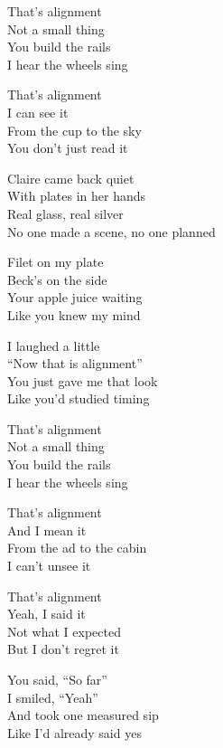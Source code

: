 \begin{lyrics}
That’s alignment\\
Not a small thing\\
You build the rails\\
I hear the wheels sing

That’s alignment\\
I can see it\\
From the cup to the sky\\
You don’t just read it

Claire came back quiet\\
With plates in her hands\\
Real glass, real silver\\
No one made a scene, no one planned

Filet on my plate\\
Beck’s on the side\\
Your apple juice waiting\\
Like you knew my mind

I laughed a little\\
“Now that is alignment”\\
You just gave me that look\\
Like you’d studied timing

That’s alignment\\
Not a small thing\\
You build the rails\\
I hear the wheels sing

That’s alignment\\
And I mean it\\
From the ad to the cabin\\
I can’t unsee it

That’s alignment\\
Yeah, I said it\\
Not what I expected\\
But I don’t regret it

You said, “So far”\\
I smiled, “Yeah”\\
And took one measured sip\\
Like I’d already said yes
\end{lyrics}

